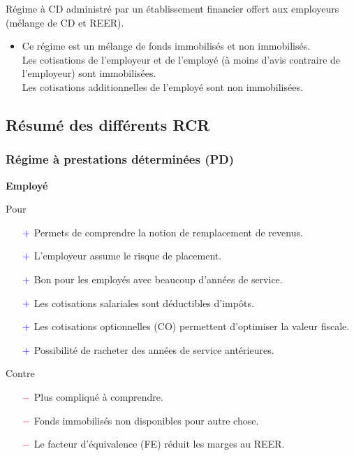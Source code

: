 \documentclass[10pt, french]{article}
\begin{document}
\begin{multicols*}{3}
\begin{definitionNOHFILL}
Régime à CD administré par un établissement financier offert aux employeurs (mélange de CD et REER).

\begin{itemize}[leftmargin = *]
	\item	Ce régime est un mélange de fonds immobilisés et non immobilisés. \\
			Les cotisations de l'employeur et de l'employé (à moins d’avis contraire de l’employeur) sont immobilisées. \\
			Les cotisations additionnelles de l'employé sont non immobilisées.
\end{itemize}
\end{definitionNOHFILL}

\columnbreak

\subsection{Résumé des différents RCR}

\subsubsection*{Régime à prestations déterminées (PD)}
\begin{center}
	\textbf{Employé}
\end{center}
Pour
\begin{itemize}
	\item[$\color{blue}+$]	Permets de comprendre la notion de remplacement de revenus.
	\item[$\color{blue}+$]	L'employeur assume le risque de placement.
	\item[$\color{blue}+$]	Bon pour les employés avec beaucoup d'années de service.
	\item[$\color{blue}+$]	Les cotisations salariales sont déductibles d'impôts.
	\item[$\color{blue}+$]	Les cotisations optionnelles (CO) permettent d'optimiser la valeur fiscale.
	\item[$\color{blue}+$]	Possibilité de racheter des années de service antérieures.
\end{itemize}

Contre
\begin{itemize}
	\item[$\color{red}-$]	Plus compliqué à comprendre.
	\item[$\color{red}-$]	Fonds immobilisés non disponibles pour autre chose.
	\item[$\color{red}-$]	Le facteur d'équivalence (FE) réduit les marges au REER.
\end{itemize}


\end{multicols*}
\end{document}
